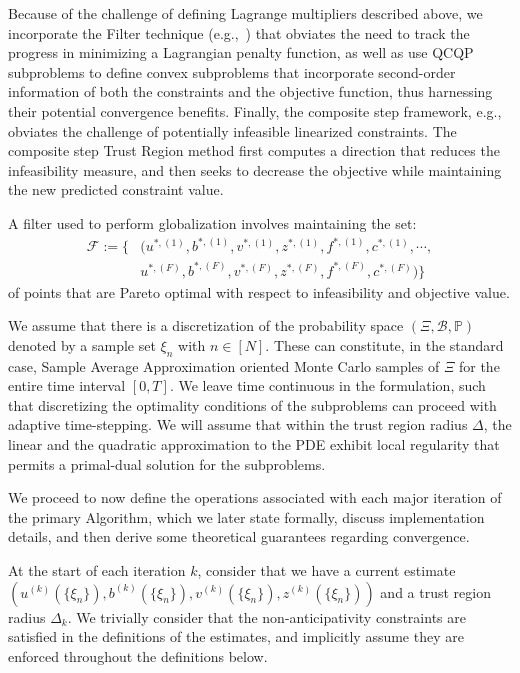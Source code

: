 \documentclass{article}
\newcommand{\1}{\mathds{1}}          %
\theoremstyle{definition}
\begin{document}
\begin{sloppypar}
Because of the challenge of defining Lagrange multipliers described above, we incorporate the Filter technique (e.g.,~\cite{fletcher2006brief}) that obviates the need to track the progress in minimizing a Lagrangian penalty function, as well as use QCQP subproblems to define convex subproblems that incorporate second-order information of both the constraints and the objective function, thus harnessing their potential convergence benefits. Finally, the composite step framework, e.g.,~\cite{heinkenschloss2014matrix} obviates the challenge of potentially infeasible linearized constraints. The composite step Trust Region method first computes a direction that reduces the infeasibility measure, and then seeks to decrease the objective while maintaining the new predicted constraint value. 

A filter used to perform globalization involves maintaining the set:
\begin{equation}\label{eq:filter}
\begin{aligned}
\mathcal{F}:=\Big\{&
(u^{*,(1)},b^{*,(1)},v^{*,(1)},z^{*,(1)},f^{*,(1)},c^{*,(1)},\cdots, \\
&u^{*,(F)},b^{*,(F)},v^{*,(F)},z^{*,(F)},f^{*,(F)},c^{*,(F)})
\Big\}
\end{aligned}
\end{equation}
of points that are Pareto optimal with respect to infeasibility and objective value. 

We assume that there is a discretization of the probability space $(\Xi,\mathcal{B},\mathbb{P})$ denoted by a sample set $\xi_n$ with $n\in[N]$. These can constitute, in the standard case, Sample Average Approximation oriented Monte Carlo samples of $\Xi$ for the entire time interval $[0,T]$. We leave time continuous in the formulation, such that discretizing the optimality conditions of the subproblems can proceed with adaptive time-stepping. We will assume that within the trust region radius $\Delta$, the linear and the quadratic approximation to the PDE exhibit local regularity that permits a primal-dual solution for the subproblems. 

We proceed to now define the operations associated with each major iteration of the primary Algorithm, which we later state formally, discuss implementation details, and then derive some theoretical guarantees regarding convergence. 

At the start of each iteration $k$, consider that we have a current estimate $(u^{(k)}(\{\xi_n\}),b^{(k)}(\{\xi_n\}),v^{(k)}(\{\xi_n\}),z^{(k)}(\{\xi_n\}))$ and a trust region radius $\Delta_k$. We trivially consider that the non-anticipativity constraints are satisfied in the definitions of the estimates, and implicitly assume they are enforced throughout the definitions below.



\end{sloppypar}
\end{document}

